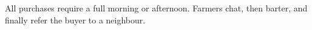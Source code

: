 \documentclass[a4paper,openany]{book}
\newcommand\baileydesc{}
\newcommand\baileymarkets{}
\newcommand\baileymarketsWide{\baileyFletcher\par}
\newcommand\baileyback{}
\edef\baileyname{\expandafter\MakeUppercase\name}
\begin{document}
\frontmatter

\pagestyle{empty}

\section*{\baileyname}

\baileydesc

All purchases require a full morning or afternoon.
Farmers chat, then barter, and finally refer the buyer to a neighbour.

\begin{multicols}{3}

\baileymarkets

\end{multicols}

\begin{multicols*}{2}

\baileymarketsWide

\end{multicols*}

\clearpage

\begin{multicols}{2}

\baileyback

\end{multicols}
\end{document}

